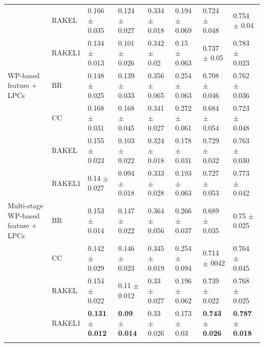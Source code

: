 \begin{table}[htb!]
{\begin{tabular}{llllllll}
                          & RAKEL           & 0.166 $\pm$ 0.035           & 0.124 $\pm$ 0.027        & 0.334 $\pm$ 0.018                & 0.194 $\pm$ 0.069        & 0.724 $\pm$ 0.048                & 0.754 $\pm$ 0.04        \\ 
                          & RAKEL1           & 0.134 $\pm$ 0.013           & 0.101 $\pm$ 0.026        & 0.342 $\pm$ 0.02                 & 0.15 $\pm$ 0.063         & 0.737 $\pm$ 0.05                 & 0.783 $\pm$ 0.023       \\ 
WP-based feature + LPCs             & BR              & 0.148 $\pm$ 0.025           & 0.139 $\pm$ 0.033        & 0.356 $\pm$ 0.065                & 0.254 $\pm$ 0.063        & 0.708 $\pm$ 0.046                & 0.762 $\pm$ 0.036       \\ 
                          & CC              & 0.168 $\pm$ 0.031           & 0.168 $\pm$ 0.045        & 0.341 $\pm$ 0.027                & 0.272 $\pm$ 0.061        & 0.684 $\pm$ 0.054                & 0.723 $\pm$ 0.048       \\ 
                          & RAKEL           & 0.155 $\pm$ 0.023           & 0.103 $\pm$ 0.022        & 0.324 $\pm$ 0.018                & 0.178 $\pm$ 0.031        & 0.729 $\pm$ 0.032                & 0.763 $\pm$ 0.030       \\ 
                          & RAKEL1           & 0.14 $\pm$ 0.027            & 0.094 $\pm$ 0.018        & 0.333 $\pm$ 0.028                & 0.193 $\pm$ 0.063        & 0.727 $\pm$ 0.053                & 0.773 $\pm$ 0.042       \\ 
Multi-stage WP-based feature + LPCs & BR              & 0.153 $\pm$ 0.014           & 0.147 $\pm$ 0.022        & 0.364 $\pm$ 0.056                & 0.266 $\pm$ 0.037        & 0.689 $\pm$ 0.035                & 0.75 $\pm$ 0.025        \\ 
                          & CC              & 0.142 $\pm$ 0.029           & 0.146 $\pm$ 0.023        & 0.345 $\pm$ 0.019                & 0.254 $\pm$ 0.094        & 0.714 $\pm$ 0042                 & 0.764 $\pm$ 0.045       \\ 
                          & RAKEL           & 0.154 $\pm$ 0.022           & 0.11 $\pm$ 0.012         & 0.33 $\pm$ 0.027                & 0.196 $\pm$ 0.062        & 0.739 $\pm$ 0.022                & 0.768 $\pm$ 0.025       \\ 
                          & RAKEL1           & \textbf{0.131 $\pm$ 0.012          } & \textbf{0.09 $\pm$ 0.014}         & 0.33 $\pm$ 0.026                 & 0.173 $\pm$ 0.03         & \textbf{0.743 $\pm$ 0.026}               & \textbf{0.787 $\pm$ 0.018}       \\ \hhline{========}
\end{tabular}
}
\end{table}




